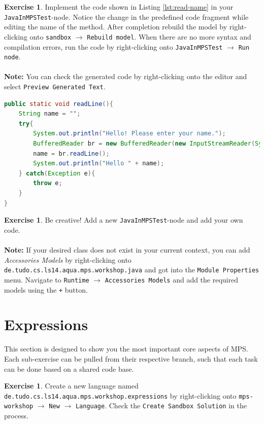 \documentclass[a4paper,oneside,DIV8,10pt]{scrartcl}
\theoremstyle{definition}
\newtheorem{aufgabe}[satz]{Exercise}
\begin{document}
  \begin{aufgabe}
  	Implement the code shown in Listing \ref{lst:read-name} in your \texttt{JavaInMPSTest}-node. Notice the change in the predefined code fragment while editing the name of the method. After completion rebuild the model by right-clicking onto \texttt{sandbox} $\rightarrow$ \texttt{Rebuild model}. When there are no more syntax and compilation errors, run the code by right-clicking onto \texttt{JavaInMPSTest} $\rightarrow$ \texttt{Run node}.\\
  	\\
  	\textbf{Note:} You can check the generated code by right-clicking onto the editor and select \texttt{Preview Generated Text}.
  	
  	\begin{lstlisting}[language=Java,caption={Java code to read a line from the console and print the result}, captionpos=b, label={lst:read-name}]
public static void readLine(){
	String name = "";
	try{
		System.out.println("Hello! Please enter your name.");
		BufferedReader br = new BufferedReader(new InputStreamReader(System.in));
		name = br.readLine();
		System.out.println("Hello " + name);
	} catch(Exception e){
		throw e;
	}
}
  		\end{lstlisting}
  \label{alg:read-name}
  \end{aufgabe}

  \begin{aufgabe}
  	Be creative! Add a new \texttt{JavaInMPSTest}-node and add your own code.\\
  	\\
  	\textbf{Note:} If your desired class does not exist in your current context, you can add \textit{Accessories Models} by right-clicking onto \texttt{de.tudo.cs.ls14.aqua.mps.workshop.java} and got into the \texttt{Module Properties} menu. Navigate to \texttt{Runtime} $\rightarrow$ \texttt{Accessories Models} and add the required models using the \texttt{+} button.
  \end{aufgabe}

	\section{Expressions}
	
	This section is designed to show you the most important core aspects of MPS. Each sub-exercise can be pulled from their respective branch, such that each task can be done based on a shared code base.
	
	\begin{aufgabe}
		Create a new language named \texttt{de.tudo.cs.ls14.aqua.mps.workshop.expressions} by right-clicking onto \texttt{mps-workshop} $\rightarrow$ \texttt{New} $\rightarrow$ \texttt{Language}. Check the \texttt{Create Sandbox Solution} in the process.
	\end{aufgabe}
\end{document}
